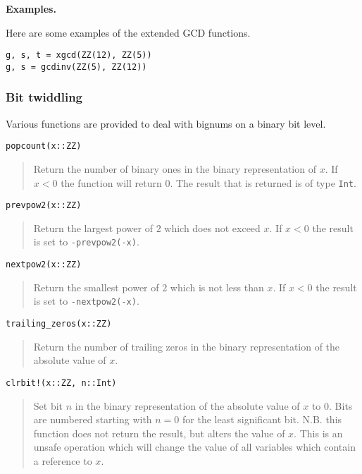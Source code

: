 \documentclass[a4paper,10pt]{article}
\newcommand{\code}{\lstinline}
\newcommand{\desc}[1]{\vspace{-3mm}\begin{quote}#1\end{quote}}
\begin{document}
{{{\textbf{Examples.}

Here are some examples of the extended GCD functions.

\begin{lstlisting}
g, s, t = xgcd(ZZ(12), ZZ(5))
g, s = gcdinv(ZZ(5), ZZ(12))
\end{lstlisting}

\subsubsection{Bit twiddling}

Various functions are provided to deal with bignums on a binary bit level.

\begin{lstlisting}
popcount(x::ZZ)
\end{lstlisting}

\desc{Return the number of binary ones in the binary representation of $x$. If $x < 0$ the
function will return $0$. The result that is returned is of type \code{Int}.}

\begin{lstlisting}
prevpow2(x::ZZ)
\end{lstlisting}

\desc{Return the largest power of $2$ which does not exceed $x$. If $x < 0$ the result is
set to \code{-prevpow2(-x)}.}

\begin{lstlisting}
nextpow2(x::ZZ)
\end{lstlisting}

\desc{Return the smallest power of $2$ which is not less than $x$. If $x < 0$ the result is
set to \code{-nextpow2(-x)}.}

\begin{lstlisting}
trailing_zeros(x::ZZ)
\end{lstlisting}

\desc{Return the number of trailing zeros in the binary representation of the absolute
value of $x$.}

\begin{lstlisting}
clrbit!(x::ZZ, n::Int)
\end{lstlisting}

\desc{Set bit $n$ in the binary representation of the absolute value of $x$ to $0$. Bits
are numbered starting with $n = 0$ for the least significant bit. N.B. this function does
not return the result, but alters the value of $x$. This is an unsafe operation which will
change the value of all variables which contain a reference to $x$.}

}}}
\end{document}

